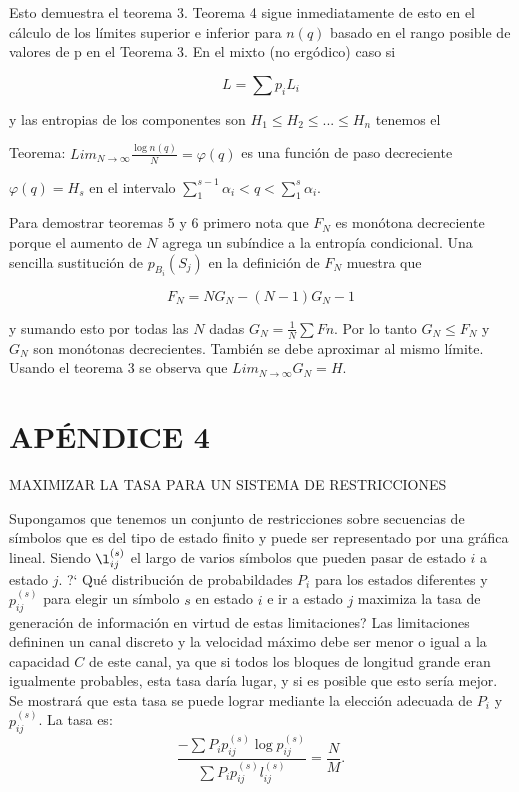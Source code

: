 Esto demuestra el teorema 3.
Teorema 4 sigue inmediatamente de esto en el c\'alculo de los l\'imites superior e 
inferior para $n(q)$ basado en el rango posible de valores de p en el Teorema 3.
En el mixto (no ergódico) caso si

\begin{equation}
L = \sum p_{i}L_{i}
\end{equation}

y las entropias de los componentes son $H_{1}\leq H_{2}\leq ... \leq H_{n}$ tenemos el 

Teorema: $Lim_{N\rightarrow \infty }\frac{\log n(q)}{N}=\varphi (q)$ es una funci\'on 
de paso decreciente

$\varphi (q)=H_{s}$ en el intervalo $\sum_{1}^{s-1}\alpha_{i}<q<\sum_{1}^{s}\alpha_{i}$.

Para demostrar teoremas 5 y 6 primero nota que $F_{N}$ es mon\'otona decreciente 
porque el aumento de $N$ agrega un sub\'indice a la entrop\'ia condicional. Una sencilla 
sustitución de $p_{B_{i}}(S_{j})$ en la definici\'on de $F_{N}$ muestra que

\begin{equation}
F_{N} = NG_{N}-(N-1)G_{N}-1
\end{equation}

y sumando esto por todas las $N$ dadas $G_{N}=\frac{1}{N}\sum F{n}$. Por lo tanto 
$G_{N}\leq F_{N}$ y $G_{N}$ son monótonas decrecientes. Tambi\'en se debe aproximar al mismo 
l\'imite. Usando el teorema 3 se observa que $Lim_{N\rightarrow \infty } G_{N} = H$.

\section{AP\'ENDICE 4}
MAXIMIZAR LA TASA PARA UN SISTEMA DE RESTRICCIONES

Supongamos que tenemos un conjunto de restricciones sobre secuencias de s\'imbolos que es 
del tipo de estado finito y puede ser representado por una gr\'afica lineal. Siendo 
$\l_{ij}^{(s)}$ el largo de varios s\'imbolos que pueden pasar de estado $i$ a estado $j$. 
?` Qu\'e distribuci\'on de probabildades $P_{i}$ para los estados diferentes y $p_{ij}^{(s)}$ 
para elegir un s\'imbolo $s$ en estado $i$ e ir a estado $j$ maximiza la tasa de generaci\'on 
de informaci\'on en virtud de estas limitaciones? Las limitaciones defininen un canal 
discreto y la velocidad m\'aximo debe ser menor o igual a la capacidad $C$ de este canal, 
ya que si todos los bloques de longitud grande eran igualmente probables, esta tasa dar\'ia 
lugar, y si es posible que esto ser\'ia mejor. Se mostrar\'a que esta tasa se puede lograr 
mediante la elecci\'on adecuada de $P_{i}$ y $p_{ij}^{(s)}$.
La tasa es:
\begin{equation}
\frac{-\sum P_{i}p_{ij}^{(s)}\log p_{ij}^{(s)}}{\sum P_{i}p_{ij}^{(s)}l _{ij}^{(s)}} = \frac{N}{M}.
\end{equation}

